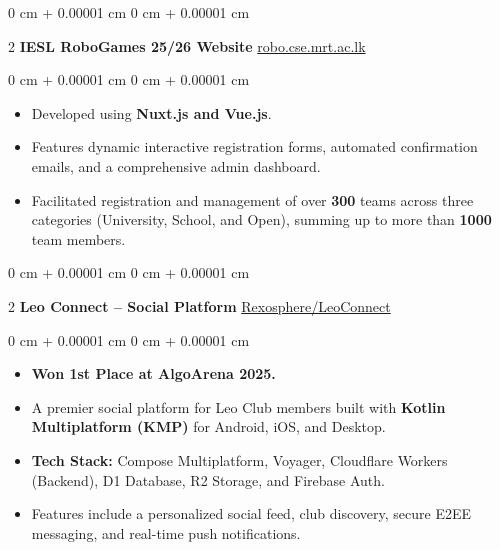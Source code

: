 \documentclass[10pt, letterpaper]{article}
\newenvironment{highlights}{ \begin{itemize}[ topsep=0.10 cm, parsep=0.10 cm, partopsep=0pt,
itemsep=0pt, leftmargin=0 cm + 10pt ] }{ \end{itemize} } %
\newenvironment{onecolentry}{ \begin{adjustwidth}{ 0 cm + 0.00001 cm }{ 0 cm + 0.00001 cm }
}{ \end{adjustwidth} } %
\newenvironment{twocolentry}[2][]{ \onecolentry \def\secondColumn{#2} \setcolumnwidth{\fill, 4.5 cm}
\begin{paracol}{2} }{ \switchcolumn \raggedleft \secondColumn \end{paracol}
\endonecolentry } %
\begin{document}
  \begin{twocolentry}
    {\href{https://robo.cse.mrt.ac.lk}{robo.cse.mrt.ac.lk}} \textbf{IESL
    RoboGames 25/26 Website}
  \end{twocolentry}
  \vspace{0.10 cm}
  \begin{onecolentry}
    \begin{highlights}
      \item Developed using \textbf{Nuxt.js and Vue.js}. \item Features dynamic interactive
      registration forms, automated confirmation emails, and a comprehensive admin
      dashboard. \item Facilitated registration and management of over \textbf{300} teams
      across three categories (University, School, and Open), summing up to more
      than \textbf{1000} team members.
    \end{highlights}
  \end{onecolentry}

  \vspace{0.5 cm}

  \begin{twocolentry}
    {\href{https://github.com/Rexosphere}{Rexosphere/LeoConnect}} \textbf{Leo
    Connect -- Social Platform}
  \end{twocolentry}
  \vspace{0.10 cm}
  \begin{onecolentry}
    \begin{highlights}
      \item \textbf{Won 1st Place at AlgoArena 2025.} \item A premier social
      platform for Leo Club members built with \textbf{Kotlin Multiplatform (KMP)}
      for Android, iOS, and Desktop. \item \textbf{Tech Stack:} Compose Multiplatform,
      Voyager, Cloudflare Workers (Backend), D1 Database, R2 Storage, and
      Firebase Auth. \item Features include a personalized social feed, club
      discovery, secure E2EE messaging, and real-time push notifications.
    \end{highlights}
  \end{onecolentry}

  \vspace{0.5 cm}
\end{document}
